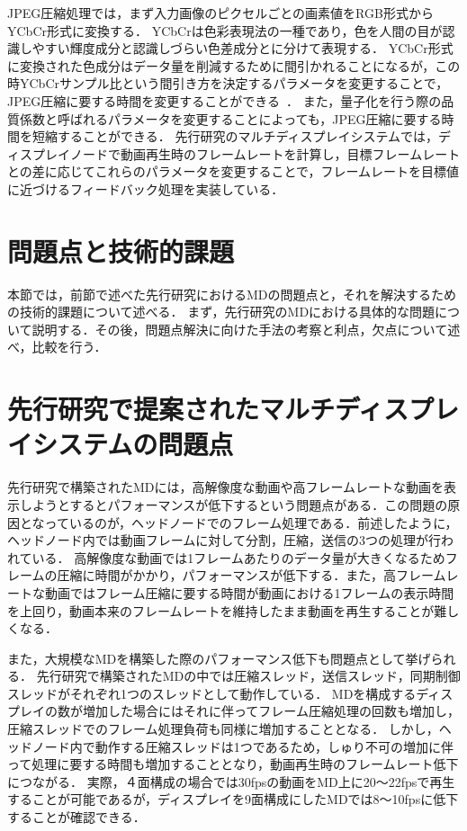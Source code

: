 JPEG圧縮処理では，まず入力画像のピクセルごとの画素値をRGB形式からYCbCr形式に変換する．
YCbCrは色彩表現法の一種であり，色を人間の目が認識しやすい輝度成分と認識しづらい色差成分とに分けて表現する\cite{YCbCr}．
YCbCr形式に変換された色成分はデータ量を削減するために間引かれることになるが，この時YCbCrサンプル比という間引き方を決定するパラメータを変更することで，
JPEG圧縮に要する時間を変更することができる~\cite{jpeg2}．
また，量子化を行う際の品質係数と呼ばれるパラメータを変更することによっても，JPEG圧縮に要する時間を短縮することができる．
先行研究のマルチディスプレイシステムでは，ディスプレイノードで動画再生時のフレームレートを計算し，目標フレームレートとの差に応じてこれらのパラメータを変更することで，フレームレートを目標値に近づけるフィードバック処理を実装している．





\section{問題点と技術的課題}

本節では，前節で述べた先行研究におけるMDの問題点と，それを解決するための技術的課題について述べる．
まず，先行研究のMDにおける具体的な問題について説明する．その後，問題点解決に向けた手法の考察と利点，欠点について述べ，比較を行う．

\section{先行研究で提案されたマルチディスプレイシステムの問題点}
先行研究で構築されたMDには，高解像度な動画や高フレームレートな動画を表示しようとするとパフォーマンスが低下するという問題点がある．この問題の原因となっているのが，ヘッドノードでのフレーム処理である．前述したように，ヘッドノード内では動画フレームに対して分割，圧縮，送信の3つの処理が行われている．
高解像度な動画では1フレームあたりのデータ量が大きくなるためフレームの圧縮に時間がかかり，パフォーマンスが低下する．また，高フレームレートな動画ではフレーム圧縮に要する時間が動画における1フレームの表示時間を上回り，動画本来のフレームレートを維持したまま動画を再生することが難しくなる．

また，大規模なMDを構築した際のパフォーマンス低下も問題点として挙げられる．
先行研究で構築されたMDの中では圧縮スレッド，送信スレッド，同期制御スレッドがそれぞれ1つのスレッドとして動作している．
MDを構成するディスプレイの数が増加した場合にはそれに伴ってフレーム圧縮処理の回数も増加し，圧縮スレッドでのフレーム処理負荷も同様に増加することとなる．
しかし，ヘッドノード内で動作する圧縮スレッドは1つであるため，しゅり不可の増加に伴って処理に要する時間も増加することとなり，動画再生時のフレームレート低下につながる．
実際，４面構成の場合では30fpsの動画をMD上に20〜22fpsで再生することが可能であるが，ディスプレイを9面構成にしたMDでは8〜10fpsに低下することが確認できる．




